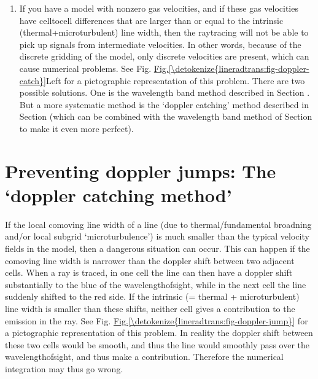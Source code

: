 \documentclass[letterpaper,10pt,english]{sphinxmanual}
\begin{document}
\begin{enumerate}
\item {} 
If you have a model with non\sphinxhyphen{}zero gas velocities, and if these gas
velocities have cell\sphinxhyphen{}to\sphinxhyphen{}cell differences that are larger than or equal to
the intrinsic (thermal+microturbulent) line width, then the ray\sphinxhyphen{}tracing
will not be able to pick up signals from intermediate velocities. In other
words, because of the discrete gridding of the model, only discrete
velocities are present, which can cause numerical problems. See
Fig. \hyperref[\detokenize{lineradtrans:fig-doppler-catch}]{Fig.\@ \ref{\detokenize{lineradtrans:fig-doppler-catch}}}\sphinxhyphen{}Left for a pictographic representation of
this problem. There are two possible solutions. One is the wavelength band
method described in Section {\hyperref[\detokenize{imagesspectra:sec-wavelength-bands}]{}}.  But a more
systematic method is the ‘doppler catching’ method described in Section
{\hyperref[\detokenize{lineradtrans:sec-doppler-catching}]{}} (which can be combined with the wavelength band
method of Section {\hyperref[\detokenize{imagesspectra:sec-wavelength-bands}]{}} to make it even more
perfect).

\end{enumerate}


\section{Preventing doppler jumps: The ‘doppler catching method’}
\label{\detokenize{lineradtrans:preventing-doppler-jumps-the-doppler-catching-method}}\label{\detokenize{lineradtrans:sec-doppler-catching}}
If the local co\sphinxhyphen{}moving line width of a line (due to thermal/fundamental
broadning and/or local subgrid ‘microturbulence’) is much smaller than the
typical velocity fields in the model, then a dangerous situation can
occur. This can happen if the co\sphinxhyphen{}moving line width is narrower than the
doppler shift between two adjacent cells. When a ray is traced, in one cell
the line can then have a doppler shift substantially to the blue of the
wavelength\sphinxhyphen{}of\sphinxhyphen{}sight, while in the next cell the line suddenly shifted to the
red side. If the intrinsic (= thermal + microturbulent) line width is
smaller than these shifts, neither cell gives a contribution to the emission
in the ray. See Fig. \hyperref[\detokenize{lineradtrans:fig-doppler-jump}]{Fig.\@ \ref{\detokenize{lineradtrans:fig-doppler-jump}}} for a pictographic
representation of this problem. In reality the doppler shift between these
two cells would be smooth, and thus the line would smoothly pass over the
wavelength\sphinxhyphen{}of\sphinxhyphen{}sight, and thus make a contribution. Therefore the numerical
integration may thus go wrong.
\end{document}
